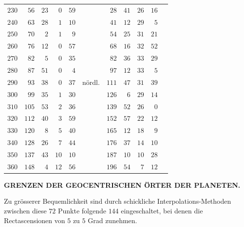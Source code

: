 \begin{center}
\begin{tabular}{r||rr|rrl||rr|rrl}
$230$&$56$&$23$&$0$&$59$&&$28$&$41$&$26$&$16$&\\
$240$&$63$&$28$&$1$&$10$&&$41$&$12$&$29$&$5$&\\[3pt]
$250$&$70$&$2$&$1$&$9$&&$54$&$25$&$31$&$21$&\\
$260$&$76$&$12$&$0$&$57$&&$68$&$16$&$32$&$52$&\\
$270$&$82$&$5$&$0$&$35$&&$82$&$36$&$33$&$29$&\\
$280$&$87$&$51$&$0$&$4$&&$97$&$12$&$33$&$5$&\\
$290$&$93$&$38$&$0$&$37$&nördl.&$111$&$47$&$31$&$39$&\\
$300$&$99$&$35$&$1$&$30$&&$126$&$6$&$29$&$14$&\\[3pt]
$310$&$105$&$53$&$2$&$36$&&$139$&$52$&$26$&$0$&\\
$320$&$112$&$40$&$3$&$59$&&$152$&$57$&$22$&$12$&\\
$330$&$120$&$8$&$5$&$40$&&$165$&$12$&$18$&$9$&\\
$340$&$128$&$26$&$7$&$44$&&$176$&$37$&$14$&$10$&\\
$350$&$137$&$43$&$10$&$10$&&$187$&$10$&$10$&$28$&\\
$360$&$148$&$4$&$12$&$56$&&$196$&$54$&$7$&$12$&
\end{tabular}
\endgroup
\end{center}
\par\nobreak\smallskip\noindent\makebox[.84\linewidth][r]{{\normalsize\bfseries 15\textsuperscript{*}}}\par
\clearpage
\thispagestyle{empty}
\noindent{}%
%
\parbox[t]{\dimexpr\linewidth-24mm\relax}{\centering\fontsize{7.4}{9.2}\selectfont\bfseries GRENZEN DER GEOCENTRISCHEN ÖRTER DER PLANETEN.\par}%
\makebox[12mm][r]{}\par\nobreak\medskip
\par\indent Zu grösserer Bequemlichkeit sind durch schickliche Interpolations-Methoden
zwischen diese $72$ Punkte folgende $144$ eingeschaltet, bei denen die Rectascensionen
von $5$ zu $5$ Grad zunehmen.

